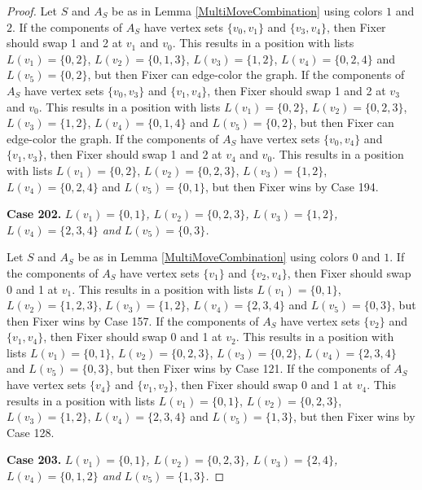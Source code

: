 \documentclass[12pt]{amsart}
\theoremstyle{plain}
\theoremstyle{definition}
\theoremstyle{remark}
\begin{document}
\begin{proof}
Let $S$ and $A_S$ be as in Lemma \ref{MultiMoveCombination} using colors $1$ and $2$. If the components of $A_S$ have vertex sets $\{v_0, v_1\}$ and $\{v_3, v_4\}$, then Fixer should swap 1 and 2 at $v_1$ and $v_0$. This results in a position with lists $L(v_1) = \{0, 2\}$, $L(v_2) = \{0, 1, 3\}$, $L(v_3) = \{1, 2\}$, $L(v_4) = \{0, 2, 4\}$ and $L(v_5) = \{0, 2\}$, but then Fixer can edge-color the graph.
If the components of $A_S$ have vertex sets $\{v_0, v_3\}$ and $\{v_1, v_4\}$, then Fixer should swap 1 and 2 at $v_3$ and $v_0$. This results in a position with lists $L(v_1) = \{0, 2\}$, $L(v_2) = \{0, 2, 3\}$, $L(v_3) = \{1, 2\}$, $L(v_4) = \{0, 1, 4\}$ and $L(v_5) = \{0, 2\}$, but then Fixer can edge-color the graph.
If the components of $A_S$ have vertex sets $\{v_0, v_4\}$ and $\{v_1, v_3\}$, then Fixer should swap 1 and 2 at $v_4$ and $v_0$. This results in a position with lists $L(v_1) = \{0, 2\}$, $L(v_2) = \{0, 2, 3\}$, $L(v_3) = \{1, 2\}$, $L(v_4) = \{0, 2, 4\}$ and $L(v_5) = \{0, 1\}$, but then Fixer wins by Case 194.

\noindent\textbf{Case 202.  }\textit{$L(v_1) = \{0, 1\}$, $L(v_2) = \{0, 2, 3\}$, $L(v_3) = \{1, 2\}$, $L(v_4) = \{2, 3, 4\}$ and $L(v_5) = \{0, 3\}$.}

Let $S$ and $A_S$ be as in Lemma \ref{MultiMoveCombination} using colors $0$ and $1$. If the components of $A_S$ have vertex sets $\{v_1\}$ and $\{v_2, v_4\}$, then Fixer should swap 0 and 1 at $v_1$. This results in a position with lists $L(v_1) = \{0, 1\}$, $L(v_2) = \{1, 2, 3\}$, $L(v_3) = \{1, 2\}$, $L(v_4) = \{2, 3, 4\}$ and $L(v_5) = \{0, 3\}$, but then Fixer wins by Case 157.
If the components of $A_S$ have vertex sets $\{v_2\}$ and $\{v_1, v_4\}$, then Fixer should swap 0 and 1 at $v_2$. This results in a position with lists $L(v_1) = \{0, 1\}$, $L(v_2) = \{0, 2, 3\}$, $L(v_3) = \{0, 2\}$, $L(v_4) = \{2, 3, 4\}$ and $L(v_5) = \{0, 3\}$, but then Fixer wins by Case 121.
If the components of $A_S$ have vertex sets $\{v_4\}$ and $\{v_1, v_2\}$, then Fixer should swap 0 and 1 at $v_4$. This results in a position with lists $L(v_1) = \{0, 1\}$, $L(v_2) = \{0, 2, 3\}$, $L(v_3) = \{1, 2\}$, $L(v_4) = \{2, 3, 4\}$ and $L(v_5) = \{1, 3\}$, but then Fixer wins by Case 128.

\noindent\textbf{Case 203.  }\textit{$L(v_1) = \{0, 1\}$, $L(v_2) = \{0, 2, 3\}$, $L(v_3) = \{2, 4\}$, $L(v_4) = \{0, 1, 2\}$ and $L(v_5) = \{1, 3\}$.}


\end{proof}
\end{document}
